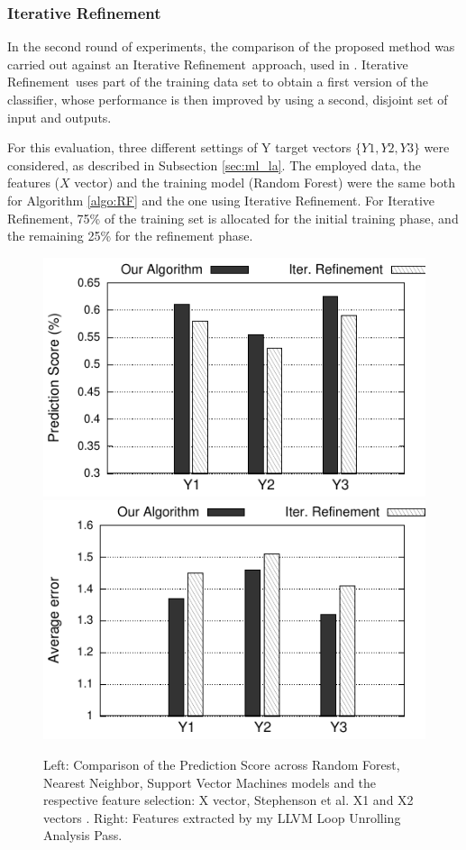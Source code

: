 \documentclass[]{usiinfthesis}
\newcommand{\RF}{{Random Forest}}
\newcommand{\ItRef}{{Iterative Refinement}}
\begin{document}
\subsubsection{Iterative Refinement}

In the second round of experiments, the comparison of the proposed method was carried out against an 
\ItRef\ approach, used in \cite{MarianiApr12} \cite{PalermoNov09} \cite{XydisMar13} \cite{ZuluagaJun12}. 
\ItRef\ uses part of the training data set
to obtain a first version of the classifier, whose performance is then improved by using a second,
disjoint set of input and outputs.\par

For this evaluation, three different settings of Y target vectors $\{Y1,Y2,Y3\}$ were considered, as 
described in Subsection \ref{sec:ml_la}. The employed data,
the features ($X$ vector) and the training model (\RF) were the same both for Algorithm \ref{algo:RF} 
and the one using \ItRef. For \ItRef, 75\% of the training set is allocated for the 
initial training phase, and the remaining 25\% for the refinement phase.

\begin{figure}
\centering
  \hspace*{-2cm}
\includegraphics[width= .5 \linewidth]{figs/iter_ref_score}
\includegraphics[width= .5 \linewidth]{figs/iter_ref_error}
\hspace*{-2cm}
\vspace*{-0.2cm}
\caption{Left: Comparison of the Prediction Score across Random Forest, Nearest Neighbor, Support Vector Machines models 
and the respective feature selection: X vector, Stephenson et al. X1 and X2 vectors \cite{StephensonApr05}.
Right: Features extracted by my LLVM Loop Unrolling Analysis Pass.}
\label{fig:iter_ref_score}
\end{figure}
\end{document}
